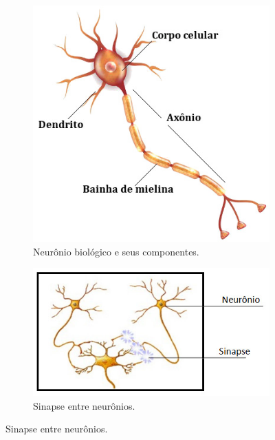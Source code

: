 \begin{figure}
	\caption{Redes neurais biológicas. Fonte: FALTANDO!}
	\begin{subfigure}[h]{0.5\linewidth}
		\caption{Neurônio biológico e seus componentes.}
		\label{fig:neuronio_biologico}
		\includegraphics[width=0.7\linewidth]{img/neuronio}
	\end{subfigure}
	\begin{subfigure}[h]{0.5\linewidth}
		\caption{Sinapse entre neurônios.}
		\label{fig:redeneuralbiologica}
		\includegraphics[width=\linewidth]{./img/redeneuralbiologica.jpg}
	\end{subfigure}%
\end{figure}


